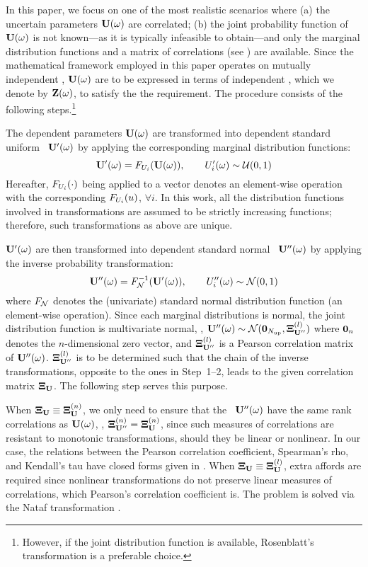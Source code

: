 In this paper, we focus on one of the most realistic scenarios where (a) the uncertain parameters $\mathbf{U}(\omega)$ are correlated; (b) the joint probability function of $\mathbf{U}(\omega)$ is not known---as it is typically infeasible to obtain---and only the marginal distribution functions and a matrix of correlations (see ) are available. Since the mathematical framework employed in this paper operates on mutually independent \rvs, $\mathbf{U}(\omega)$ are to be expressed in terms of independent \rvs, which we denote by $\mathbf{Z}(\omega)$, to satisfy the the requirement. The procedure consists of the following steps.\footnote{However, if the joint distribution function is available, Rosenblatt's transformation \cite{rosenblatt1952} is a preferable choice.}

 The dependent parameters $\mathbf{U}(\omega)$ are transformed into dependent standard uniform \rvs\ $\mathbf{U}'(\omega)$ by applying the corresponding marginal distribution functions:
\begin{equation} \elabel{dependent-uniform}
  \vU'(\o) = \CDF_{\U_i}(\vU(\o)), \qquad \U'_i(\o) \sim \uniform(0, 1)
\end{equation}
Hereafter, $F_{U_i}(\cdot)$ being applied to a vector denotes an element-wise operation with the corresponding $F_{U_i}(u)$, $\forall i$. In this work, all the distribution functions involved in transformations are assumed to be strictly increasing functions; therefore, such transformations as above are unique.

 $\mathbf{U}'(\omega)$ are then transformed into dependent standard normal \rvs\ $\mathbf{U}''(\omega)$ by applying the inverse probability transformation:
\begin{equation} \elabel{dependent-normal}
  \vU''(\o) = \CDF^{-1}_\normal(\vU'(\o)), \qquad \U''_i(\o) \sim \normal(0, 1)
\end{equation}
where $F_{\mathcal{N}}$ denotes the (univariate) standard normal distribution function (an element-wise operation). Since each marginal distributions is normal, the joint distribution function is multivariate normal, \ie, $\mathbf{U}''(\omega) \sim \mathcal{N}(\mathbf{0}_{N_\text{up}}, \mathbf{\Xi}^{(l)}_{\mathbf{U}''})$ where $\mathbf{0}_n$ denotes the $n$-dimensional zero vector, and $\mathbf{\Xi}^{(l)}_{\mathbf{U}''}$ is a Pearson correlation matrix of $\mathbf{U}''(\omega)$. $\mathbf{\Xi}^{(l)}_{\mathbf{U}''}$ is to be determined such that the chain of the inverse transformations, opposite to the ones in Step~1--2, leads to the given correlation matrix $\mathbf{\Xi}_{\mathbf{U}}$. The following step serves this purpose.

 When $\mathbf{\Xi}_{\mathbf{U}} \equiv \mathbf{\Xi}^{(n)}_{\mathbf{U}}$, we only need to ensure that the \rvs\ $\mathbf{U}''(\omega)$ have the same rank correlations as $\mathbf{U}(\omega)$, \ie, $\mathbf{\Xi}^{(n)}_{\mathbf{U}''} = \mathbf{\Xi}^{(n)}_{\mathbf{U}}$, since such measures of correlations are resistant to monotonic transformations, should they be linear or nonlinear. In our case, the relations between the Pearson correlation coefficient, Spearman's rho, and Kendall's tau have closed forms given in . When $\mathbf{\Xi}_{\mathbf{U}} \equiv \mathbf{\Xi}^{(l)}_{\mathbf{U}}$, extra affords are required since nonlinear transformations do not preserve linear measures of correlations, which Pearson's correlation coefficient is. The problem is solved via the Nataf transformation \cite{li2008}.

